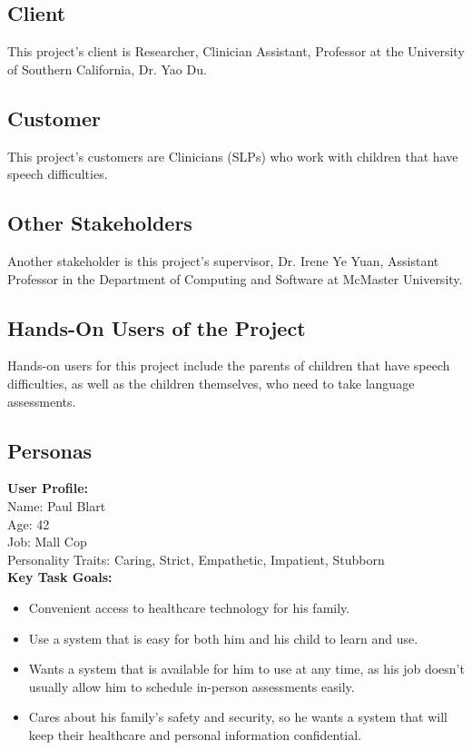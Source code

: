 \documentclass[12pt]{article}
\begin{document}
\subsection{Client}
This project's client is Researcher, Clinician Assistant, Professor at the University of Southern California, Dr. Yao Du.
\subsection{Customer}
This project's customers are Clinicians (SLPs) who work with children that have speech difficulties.
\subsection{Other Stakeholders}
Another stakeholder is this project's supervisor, Dr. Irene Ye Yuan, Assistant Professor in the Department of Computing and Software at McMaster University.

\subsection{Hands-On Users of the Project}
Hands-on users for this project include the parents of children that have speech difficulties, as well as the children themselves, who need to take language assessments.
\subsection{Personas}
\textbf{User Profile:}\\
Name: Paul Blart\\
Age: 42\\
Job: Mall Cop\\
Personality Traits: Caring, Strict, Empathetic, Impatient, Stubborn\\

\textbf{Key Task Goals:}
\begin{itemize}
  \item Convenient access to healthcare technology for his family.
  \item Use a system that is easy for both him and his child to learn and use.
  \item Wants a system that is available for him to use at any time, as his job doesn't usually allow him to schedule in-person assessments easily.
  \item Cares about his family's safety and security, so he wants a system that will keep their healthcare and personal information confidential.  
\end{itemize}
\end{document}

